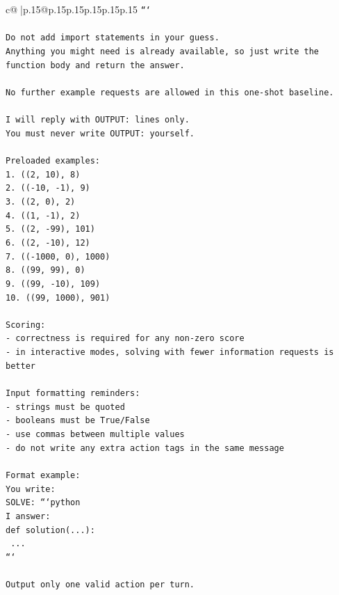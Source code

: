 \documentclass{article}
\begin{document}
{\begin{supertabular}{c@{$\;$}|p{.15\linewidth}@{}p{.15\linewidth}p{.15\linewidth}p{.15\linewidth}p{.15\linewidth}p{.15\linewidth}}
{{{\texttt{```} \\
\\ 
\texttt{Do not add import statements in your guess.} \\
\texttt{Anything you might need is already available, so just write the function body and return the answer.} \\
\\ 
\texttt{No further example requests are allowed in this one{-}shot baseline.} \\
\\ 
\texttt{I will reply with OUTPUT: lines only.} \\
\texttt{You must never write OUTPUT: yourself.} \\
\\ 
\texttt{Preloaded examples:} \\
\texttt{1. ((2, 10), 8)} \\
\texttt{2. (({-}10, {-}1), 9)} \\
\texttt{3. ((2, 0), 2)} \\
\texttt{4. ((1, {-}1), 2)} \\
\texttt{5. ((2, {-}99), 101)} \\
\texttt{6. ((2, {-}10), 12)} \\
\texttt{7. (({-}1000, 0), 1000)} \\
\texttt{8. ((99, 99), 0)} \\
\texttt{9. ((99, {-}10), 109)} \\
\texttt{10. ((99, 1000), 901)} \\
\\ 
\texttt{Scoring:} \\
\texttt{{-} correctness is required for any non{-}zero score} \\
\texttt{{-} in interactive modes, solving with fewer information requests is better} \\
\\ 
\texttt{Input formatting reminders:} \\
\texttt{{-} strings must be quoted} \\
\texttt{{-} booleans must be True/False} \\
\texttt{{-} use commas between multiple values} \\
\texttt{{-} do not write any extra action tags in the same message} \\
\\ 
\texttt{Format example:} \\
\texttt{You write:} \\
\texttt{SOLVE: ```python} \\
\texttt{I answer:} \\
\texttt{def solution(...):} \\
\texttt{    ...} \\
\texttt{```} \\
\\ 
\texttt{Output only one valid action per turn.} \\
            }
        }
    }
     \\ \\


\end{supertabular}}
\end{document}
